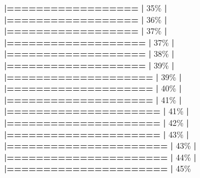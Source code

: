 \documentclass[
]{book}
\newenvironment{Shaded}{\begin{snugshade}}{\end{snugshade}}
\newcommand{\DecValTok}[1]{\textcolor[rgb]{0.00,0.00,0.81}{#1}}
\newcommand{\ErrorTok}[1]{\textcolor[rgb]{0.64,0.00,0.00}{\textbf{#1}}}
\newcommand{\NormalTok}[1]{#1}
\newcommand{\SpecialCharTok}[1]{\textcolor[rgb]{0.81,0.36,0.00}{\textbf{#1}}}
\begin{document}
\begin{Shaded}
\begin{Highlighting}[]
  \ErrorTok{|==================}                                \ErrorTok{|}  \DecValTok{35}\NormalTok{\%}
  \SpecialCharTok{|}                                                        
  \ErrorTok{|==================}                                \ErrorTok{|}  \DecValTok{36}\NormalTok{\%}
  \SpecialCharTok{|}                                                        
  \ErrorTok{|==================}                                \ErrorTok{|}  \DecValTok{37}\NormalTok{\%}
  \SpecialCharTok{|}                                                        
  \ErrorTok{|===================}                               \ErrorTok{|}  \DecValTok{37}\NormalTok{\%}
  \SpecialCharTok{|}                                                        
  \ErrorTok{|===================}                               \ErrorTok{|}  \DecValTok{38}\NormalTok{\%}
  \SpecialCharTok{|}                                                        
  \ErrorTok{|===================}                               \ErrorTok{|}  \DecValTok{39}\NormalTok{\%}
  \SpecialCharTok{|}                                                        
  \ErrorTok{|====================}                              \ErrorTok{|}  \DecValTok{39}\NormalTok{\%}
  \SpecialCharTok{|}                                                        
  \ErrorTok{|====================}                              \ErrorTok{|}  \DecValTok{40}\NormalTok{\%}
  \SpecialCharTok{|}                                                        
  \ErrorTok{|====================}                              \ErrorTok{|}  \DecValTok{41}\NormalTok{\%}
  \SpecialCharTok{|}                                                        
  \ErrorTok{|=====================}                             \ErrorTok{|}  \DecValTok{41}\NormalTok{\%}
  \SpecialCharTok{|}                                                        
  \ErrorTok{|=====================}                             \ErrorTok{|}  \DecValTok{42}\NormalTok{\%}
  \SpecialCharTok{|}                                                        
  \ErrorTok{|=====================}                             \ErrorTok{|}  \DecValTok{43}\NormalTok{\%}
  \SpecialCharTok{|}                                                        
  \ErrorTok{|======================}                            \ErrorTok{|}  \DecValTok{43}\NormalTok{\%}
  \SpecialCharTok{|}                                                        
  \ErrorTok{|======================}                            \ErrorTok{|}  \DecValTok{44}\NormalTok{\%}
  \SpecialCharTok{|}                                                        
  \ErrorTok{|======================}                            \ErrorTok{|}  \DecValTok{45}\NormalTok{\%}

\end{Highlighting}
\end{Shaded}
\end{document}

